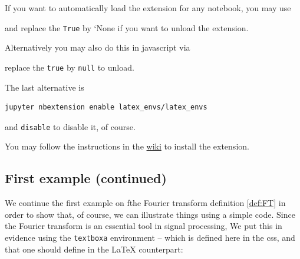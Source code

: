     If you want to automatically load the extension for any notebook, you
may use

\begin{Shaded}
\begin{Highlighting}[]
  
\NormalTok{, \{}\NormalTok{: \{}\NormalTok{: }\NormalTok{\}\})}
\end{Highlighting}
\end{Shaded}

    and replace the \texttt{True} by `None if you want to unload the
extension.

Alternatively you may also do this in javascript via

\begin{Shaded}
\end{Shaded}

    replace the \texttt{true} by \texttt{null} to unload.

The last alternative is

\begin{verbatim}
jupyter nbextension enable latex_envs/latex_envs
\end{verbatim}

    and \texttt{disable} to disable it, of course.

    You may follow the instructions in the
\href{https://github.com/ipython-contrib/IPython-notebook-extensions/wiki}{wiki}
to install the extension.

    \subsection{First example (continued)}\label{first-example-continued}

    We continue the first example on fthe Fourier transform definition
\ref{def:FT} in order to show that, of course, we can illustrate things
using a simple code. Since the Fourier transform is an essential tool in
signal processing, We put this in evidence using the \texttt{textboxa}
environment -- which is defined here in the css, and that one should
define in the LaTeX counterpart:

